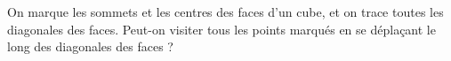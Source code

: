 On marque les sommets et les centres des faces d'un cube, et on trace toutes les diagonales des faces. Peut-on visiter tous les points marqués en se déplaçant le long des diagonales des faces ?

